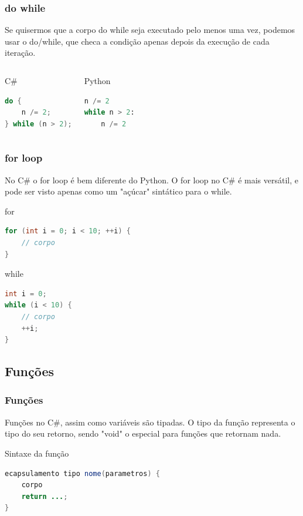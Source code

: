 \documentclass{beamer}
\begin{document}
	\begin{frame}[fragile]
		\frametitle{do while}

		Se quisermos que a corpo do while seja executado pelo menos uma vez,
		podemos usar o do/while, que checa a condição apenas depois da execução
		de cada iteração.

		\begin{columns}
			\begin{block}{C\#}
				\begin{lstlisting}[language=Java,basicstyle=\ttfamily,keywordstyle=\color{blue}]
do {
	n /= 2;
} while (n > 2);
				\end{lstlisting}
			\end{block}
			\begin{block}{Python}
				\begin{lstlisting}[language=Python,basicstyle=\ttfamily,keywordstyle=\color{blue}]
n /= 2
while n > 2:
	n /= 2
				\end{lstlisting}
			\end{block}
		\end{columns}
	\end{frame}

	\begin{frame}[fragile]
		\frametitle{for loop}

		No C\# o for loop é bem diferente do Python. O for loop no C\# é mais versátil, e pode ser visto apenas como um "açúcar" sintático para o while.


			\begin{block}{for}
				\begin{lstlisting}[language=Java,basicstyle=\ttfamily,keywordstyle=\color{blue}]
for (int i = 0; i < 10; ++i) {
	// corpo
}
				\end{lstlisting}
			\end{block}
			\begin{block}{while}
				\begin{lstlisting}[language=Java,basicstyle=\ttfamily,keywordstyle=\color{blue}]
int i = 0;
while (i < 10) {
	// corpo
	++i;
}
				\end{lstlisting}
			\end{block}
	\end{frame}

	\subsection{Funções}
	\begin{frame}[fragile]
		\frametitle{Funções}
		Funções no C\#, assim como variáveis são tipadas. O tipo da função representa o tipo do seu retorno, sendo "void" o especial para funções que retornam nada.

			\begin{block}{Sintaxe da função}
				\begin{lstlisting}[language=Java,basicstyle=\ttfamily,keywordstyle=\color{blue}]
ecapsulamento tipo nome(parametros) {
	corpo
	return ...;
}
				\end{lstlisting}
			\end{block}
	\end{frame}
\end{document}
